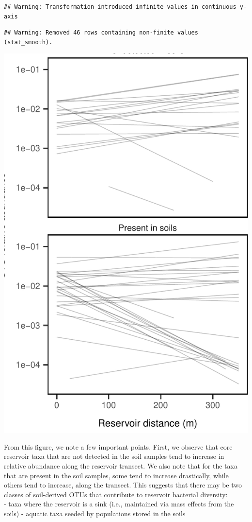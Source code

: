 \documentclass[]{article}
\begin{document}
\begin{verbatim}
## Warning: Transformation introduced infinite values in continuous y-axis
\end{verbatim}

\begin{verbatim}
## Warning: Removed 46 rows containing non-finite values (stat_smooth).
\end{verbatim}

\begin{center}\includegraphics{ReservoirGradient_files/figure-latex/coreplot-1} \end{center}

From this figure, we note a few important points. First, we observe that
core reservoir taxa that are not detected in the soil samples tend to
increase in relative abundance along the reservoir transect. We also
note that for the taxa that are present in the soil samples, some tend
to increase drastically, while others tend to increase, along the
transect. This suggests that there may be two classes of soil-derived
OTUs that contribute to reservoir bacterial diversity:\\
- taxa where the reservoir is a sink (i.e., maintained via mass effects
from the soils) - aquatic taxa seeded by populations stored in the soils
\end{document}

